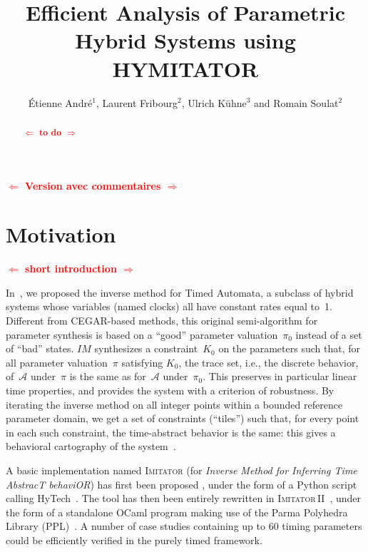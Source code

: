 \documentclass{llncs}
\title{Efficient Analysis of Parametric Hybrid Systems using HYMITATOR}
\author{\'Etienne Andr\'e$^1$, Laurent Fribourg$^2$, Ulrich K\"uhne$^3$ and Romain Soulat$^2$}
\institute{$^1$LIPN, CNRS UMR 7030, Université Paris 13, France \\
$^2$ENS Cachan, CNRS, LSV, UMR8643 \\
$^3$Universit\"at Bremen, Germany}
\newcommand{\A}{\mathcal{A}}
\newcommand{\Ko}{K_0}
\newcommand{\pio}{\pi_0}
\newcommand{\piprime}{\pi}
\newcommand{\IM}{\mathit{IM}}
\newcommand{\hytech}{{\sc HyTech}}
\newcommand{\imitator}{\textsc{Imitator}}
\newcommand{\imitatordeux}{\textsc{Imitator}\,II}
\newcommand{\ocaml}{OCaml}
\newcommand{\python}{Python}
\newcommand{\commentaire}[1]{\textcolor{red}{\textbf{$\Leftarrow$  #1 $\Rightarrow$}}}
\begin{document}
\maketitle

\begin{abstract}
	\commentaire{to do}
\end{abstract}


\commentaire{Version avec commentaires}


\section{Motivation}

\commentaire{short introduction}

In~\cite{acef09}, we proposed the inverse method for Timed Automata, a subclass of hybrid systems whose variables (named clocks) all have constant rates equal to~1.
Different from CEGAR-based methods, this original semi-algorithm for parameter synthesis is based on a ``good'' parameter valuation~$\pio$ instead of a set of ``bad'' states.
$\IM$ synthesizes a constraint~$\Ko$ on the parameters such that, for all parameter valuation~$\piprime$ satisfying $\Ko$, the trace set, i.e., the discrete behavior, of~$\A$ under~$\piprime$ is the same as for~$\A$ under~$\pio$.
This preserves in particular linear time properties, and provides the system with a criterion of robustness.
By iterating the inverse method on all integer points within a bounded reference parameter domain, we get a set of constraints (``tiles'') such that, for every point in each such constraint, the time-abstract behavior is the same: this gives a behavioral cartography of the system~\cite{af10}.

A basic implementation named \imitator{} (for \emph{Inverse Method for Inferring Time AbstracT behaviOR}) has first been proposed%
, under the form of a \python{} script calling \hytech{}~\cite{hhw97}.
The tool has then been entirely rewritten in \imitatordeux{}~\cite{and10}, under the form of a standalone \ocaml{} program making use of the Parma Polyhedra Library (PPL)~\cite{bhz08}.
A number of case studies containing up to 60 timing parameters could be efficiently verified in the purely timed framework.
\end{document}
